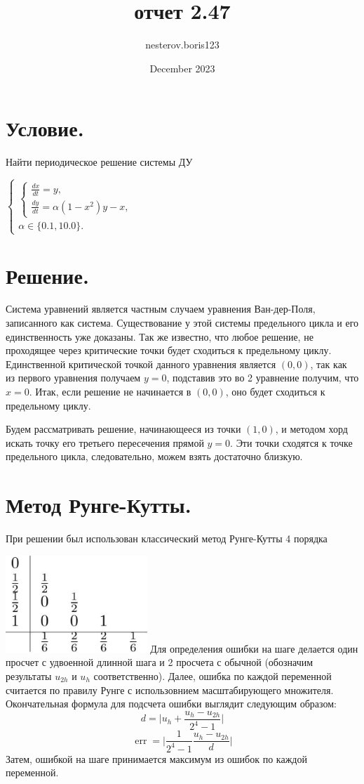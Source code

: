 \documentclass{article}
\title{отчет 2.47}
\author{nesterov.boris123 }
\date{December 2023}
\DeclareMathOperator{\err}{err}
\begin{document}
\section{Условие.}
Найти периодическое решение системы ДУ

$\left\{\begin{array}{l}\left\{\begin{array}{l}\frac{d x}{d t}=y, \\ \frac{d y}{d t}=\alpha\left(1-x^2\right) y-x,\end{array}\right. \\ \alpha \in\{0.1,10.0\} .\end{array}\right.$



\section{Решение.}
Система уравнений является частным случаем уравнения Ван-дер-Поля, записанного как система. Существование у этой системы предельного цикла и его единственность уже доказаны. Так же известно, что любое решение, не проходящее через критические точки будет сходиться к предельному циклу. Единственной критической точкой данного уравнения является $(0,0)$, так как из первого уравнения получаем $y = 0$, подставив это во 2 уравнение получим, что $x = 0$. Итак, если решение не начинается в $(0,0)$, оно будет сходиться к предельному циклу.

Будем рассматривать решение, начинающееся из точки $(1,0)$, и методом хорд искать точку его третьего пересечения прямой $y = 0$. Эти точки сходятся к точке предельного цикла, следовательно, можем взять достаточно близкую.

\section{Метод Рунге-Кутты.}
При решении был использован классический метод Рунге-Кутты 4 порядка


\includegraphics[width=0.4\textwidth]{rungeKutta}
Для определения ошибки на шаге делается один просчет с удвоенной длинной шага и 2 просчета с обычной (обозначим результаты $u_{2h}$ и $u_h$ соответственно). Далее, ошибка по каждой переменной считается по правилу Рунге с использовнием масштабирующего множителя.
Окончательная формула для подсчета ошибки выглядит следующим образом:
$$
d = \big|u_h + \frac{u_h - u_{2h}}{2^4-1}\big|
$$
$$
\err = \big| \frac{1}{2^4-1}\frac{u_h - u_{2h}}{d}\big|
$$
Затем, ошибкой на шаге принимается максимум из ошибок по каждой переменной.
\end{document}
